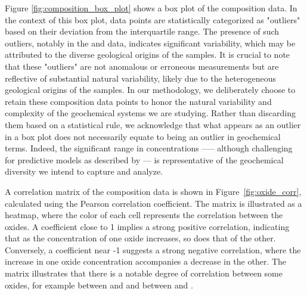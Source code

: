 Figure \ref{fig:composition_box_plot} shows a box plot of the composition data.
In the context of this box plot, data points are statistically categorized as "outliers" based on their deviation from the interquartile range.
The presence of such outliers, notably in the  and  data, indicates significant variability, which may be attributed to the diverse geological origins of the samples.
It is crucial to note that these "outliers" are not anomalous or erroneous measurements but are reflective of substantial natural variability, likely due to the heterogeneous geological origins of the samples.
In our methodology, we deliberately choose to retain these composition data points to honor the natural variability and complexity of the geochemical systems we are studying.
Rather than discarding them based on a statistical rule, we acknowledge that what appears as an outlier in a box plot does not necessarily equate to being an outlier in geochemical terms.
Indeed, the significant range in  concentrations —-- although challenging for predictive models as described by \citet{cleggRecalibrationMarsScience2017} --- is representative of the geochemical diversity we intend to capture and analyze.

A correlation matrix of the composition data is shown in Figure~\ref{fig:oxide_corr}, calculated using the Pearson correlation coefficient.
The matrix is illustrated as a heatmap, where the color of each cell represents the correlation between the oxides.
A coefficient close to 1 implies a strong positive correlation, indicating that as the concentration of one oxide increases, so does that of the other.
Conversely, a coefficient near -1 suggests a strong negative correlation, where the increase in one oxide concentration accompanies a decrease in the other.
The matrix illustrates that there is a notable degree of correlation between some oxides, for example between  and  and between  and .
